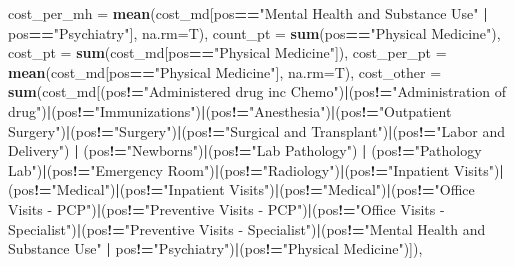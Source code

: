 \documentclass[]{article}
\newenvironment{Shaded}{\begin{snugshade}}{\end{snugshade}}
\newcommand{\KeywordTok}[1]{\textcolor[rgb]{0.13,0.29,0.53}{\textbf{#1}}}
\newcommand{\DataTypeTok}[1]{\textcolor[rgb]{0.13,0.29,0.53}{#1}}
\newcommand{\StringTok}[1]{\textcolor[rgb]{0.31,0.60,0.02}{#1}}
\newcommand{\OperatorTok}[1]{\textcolor[rgb]{0.81,0.36,0.00}{\textbf{#1}}}
\newcommand{\NormalTok}[1]{#1}
\begin{document}
\begin{Shaded}
\begin{Highlighting}[]
{{{            \DataTypeTok{cost_per_mh =} \KeywordTok{mean}\NormalTok{(cost_md[pos}\OperatorTok{==}\StringTok{"Mental Health and Substance Use"} \OperatorTok{|}\StringTok{ }\NormalTok{pos}\OperatorTok{==}\StringTok{"Psychiatry"}\NormalTok{], }\DataTypeTok{na.rm=}\NormalTok{T),}
            \DataTypeTok{count_pt =} \KeywordTok{sum}\NormalTok{(pos}\OperatorTok{==}\StringTok{"Physical Medicine"}\NormalTok{),}
            \DataTypeTok{cost_pt =} \KeywordTok{sum}\NormalTok{(cost_md[pos}\OperatorTok{==}\StringTok{"Physical Medicine"}\NormalTok{]),}
            \DataTypeTok{cost_per_pt =}  \KeywordTok{mean}\NormalTok{(cost_md[pos}\OperatorTok{==}\StringTok{"Physical Medicine"}\NormalTok{], }\DataTypeTok{na.rm=}\NormalTok{T),}
            \DataTypeTok{cost_other =} \KeywordTok{sum}\NormalTok{(cost_md[(pos}\OperatorTok{!=}\StringTok{"Administered drug inc Chemo"}\NormalTok{)}\OperatorTok{|}\NormalTok{(pos}\OperatorTok{!=}\StringTok{"Administration of drug"}\NormalTok{)}\OperatorTok{|}\NormalTok{(pos}\OperatorTok{!=}\StringTok{"Immunizations"}\NormalTok{)}\OperatorTok{|}\NormalTok{(pos}\OperatorTok{!=}\StringTok{"Anesthesia"}\NormalTok{)}\OperatorTok{|}\NormalTok{(pos}\OperatorTok{!=}\StringTok{"Outpatient Surgery"}\NormalTok{)}\OperatorTok{|}\NormalTok{(pos}\OperatorTok{!=}\StringTok{"Surgery"}\NormalTok{)}\OperatorTok{|}\NormalTok{(pos}\OperatorTok{!=}\StringTok{"Surgical and Transplant"}\NormalTok{)}\OperatorTok{|}\NormalTok{(pos}\OperatorTok{!=}\StringTok{"Labor and Delivery"}\NormalTok{) }\OperatorTok{|}\StringTok{ }\NormalTok{(pos}\OperatorTok{!=}\StringTok{"Newborns"}\NormalTok{)}\OperatorTok{|}\NormalTok{(pos}\OperatorTok{!=}\StringTok{"Lab Pathology"}\NormalTok{) }\OperatorTok{|}\StringTok{ }\NormalTok{(pos}\OperatorTok{!=}\StringTok{"Pathology Lab"}\NormalTok{)}\OperatorTok{|}\NormalTok{(pos}\OperatorTok{!=}\StringTok{"Emergency Room"}\NormalTok{)}\OperatorTok{|}\NormalTok{(pos}\OperatorTok{!=}\StringTok{"Radiology"}\NormalTok{)}\OperatorTok{|}\NormalTok{(pos}\OperatorTok{!=}\StringTok{"Inpatient Visits"}\NormalTok{)}\OperatorTok{|}\NormalTok{(pos}\OperatorTok{!=}\StringTok{"Medical"}\NormalTok{)}\OperatorTok{|}\NormalTok{(pos}\OperatorTok{!=}\StringTok{"Inpatient Visits"}\NormalTok{)}\OperatorTok{|}\NormalTok{(pos}\OperatorTok{!=}\StringTok{"Medical"}\NormalTok{)}\OperatorTok{|}\NormalTok{(pos}\OperatorTok{!=}\StringTok{"Office Visits - PCP"}\NormalTok{)}\OperatorTok{|}\NormalTok{(pos}\OperatorTok{!=}\StringTok{"Preventive Visits - PCP"}\NormalTok{)}\OperatorTok{|}\NormalTok{(pos}\OperatorTok{!=}\StringTok{"Office Visits - Specialist"}\NormalTok{)}\OperatorTok{|}\NormalTok{(pos}\OperatorTok{!=}\StringTok{"Preventive Visits - Specialist"}\NormalTok{)}\OperatorTok{|}\NormalTok{(pos}\OperatorTok{!=}\StringTok{"Mental Health and Substance Use"} \OperatorTok{|}\StringTok{ }\NormalTok{pos}\OperatorTok{!=}\StringTok{"Psychiatry"}\NormalTok{)}\OperatorTok{|}\NormalTok{(pos}\OperatorTok{!=}\StringTok{"Physical Medicine"}\NormalTok{)]),}
}}}
\end{Highlighting}
\end{Shaded}
\end{document}
